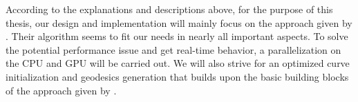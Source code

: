 \documentclass{stdlocal}
\begin{document}
According to the explanations and descriptions above, for the purpose of this thesis, our design and implementation will mainly focus on the approach given by \textcite{lawonn2014}.
Their algorithm seems to fit our needs in nearly all important aspects.
To solve the potential performance issue and get real-time behavior, a parallelization on the CPU and GPU will be carried out.
We will also strive for an optimized curve initialization and geodesics generation that builds upon the basic building blocks of the approach given by \textcite{mancinelli2022}.


\end{document}
